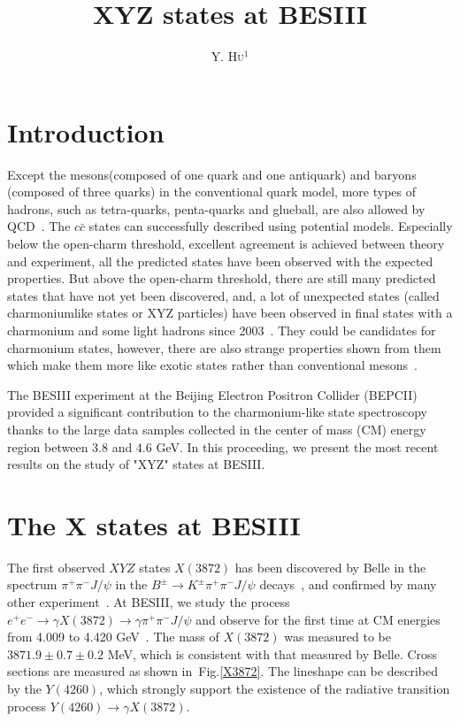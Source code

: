 \documentclass{jps-cp}
\title{XYZ states at BESIII}
\author{Y. \textsc{Hu}$^{1}$}
\begin{document}
\maketitle

\section{Introduction}



Except the mesons(composed of one quark and one antiquark) and baryons (composed of three quarks) in the conventional quark model, more types
of hadrons, such as tetra-quarks, penta-quarks and glueball, are also allowed by QCD~\cite{exotics_theory}. The $c\bar{c}$ states can successfully described using potential models. Especially below the open-charm threshold, excellent agreement is achieved between theory and experiment, all the predicted states have been observed with the expected properties. But above the open-charm threshold, there are still many predicted states that have not yet been discovered, and, a lot of unexpected states (called charmoniumlike states or XYZ particles) have been observed in final states with a charmonium and some light hadrons since 2003~\cite{XYZ_review}. They could be candidates for charmonium states, however, there are also strange properties shown from them which make them more like exotic states rather than conventional mesons~\cite{XYZ_review}.

The BESIII experiment at the Beijing Electron Positron Collider (BEPCII) provided a significant contribution to the charmonium-like state spectroscopy thanks to the large data samples collected in the center of mass (CM) energy region between 3.8 and 4.6 GeV. In this proceeding,  we present the most recent results on the study of "XYZ" states at BESIII.



\section{The X states at BESIII}
The first observed $XYZ$ states $X(3872)$ has been discovered by Belle in the spectrum $\pi^{+}\pi^{-}J/\psi$ in the $B^{\pm} \rightarrow K^{\pm} \pi^{+}\pi^{-}J/\psi$ decays~\cite{X3872Belle}, and confirmed by many other experiment~\cite{X3872CDF,X3872D0,X3872BABAR}.
At BESIII, we study the process $e^{+}e^{-} \rightarrow \gamma X(3872) \rightarrow \gamma \pi^{+} \pi^{-} J/\psi$ and observe for the first time  at CM energies from 4.009 to 4.420 GeV~\cite{gammaX3872BESIII}. The mass of $X(3872)$ was measured to be $3871.9 \pm 0.7 \pm 0.2$ MeV, which is consistent with that measured by Belle. Cross sections are measured as shown in~Fig.\ref{X3872}. The lineshape can be described by the $Y(4260)$, which strongly support the existence of the radiative transition process $Y(4260) \rightarrow \gamma X(3872)$.
\end{document}

